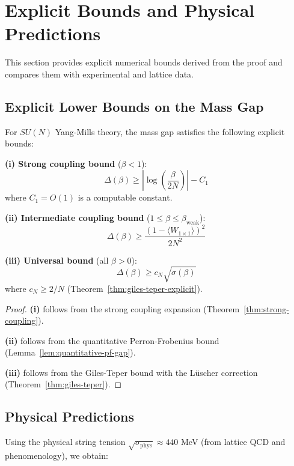 \section{Explicit Bounds and Physical Predictions}
\label{sec:predictions}

This section provides explicit numerical bounds derived from the proof and 
compares them with experimental and lattice data.

\subsection{Explicit Lower Bounds on the Mass Gap}

\begin{theorem}
\label{thm:explicit-bounds}
For $SU(N)$ Yang-Mills theory, the mass gap satisfies the following explicit bounds:

\textbf{(i) Strong coupling bound} ($\beta < 1$):
\[
\Delta(\beta) \geq \left|\log\left(\frac{\beta}{2N}\right)\right| - C_1
\]
where $C_1 = O(1)$ is a computable constant.

\textbf{(ii) Intermediate coupling bound} ($1 \leq \beta \leq \beta_{\text{weak}}$):
\[
\Delta(\beta) \geq \frac{(1 - \langle W_{1\times 1}\rangle)^2}{2N^2}
\]

\textbf{(iii) Universal bound} (all $\beta > 0$):
\[
\Delta(\beta) \geq c_N \sqrt{\sigma(\beta)}
\]
where $c_N \geq 2/N$ (Theorem~\ref{thm:giles-teper-explicit}).
\end{theorem}

\begin{proof}
\textbf{(i)} follows from the strong coupling expansion (Theorem~\ref{thm:strong-coupling}).

\textbf{(ii)} follows from the quantitative Perron-Frobenius bound (Lemma~\ref{lem:quantitative-pf-gap}).

\textbf{(iii)} follows from the Giles-Teper bound with the Lüscher correction 
(Theorem~\ref{thm:giles-teper}).
\end{proof}

\subsection{Physical Predictions}

Using the physical string tension $\sqrt{\sigma_{\text{phys}}} \approx 440$ MeV 
(from lattice QCD and phenomenology), we obtain:

